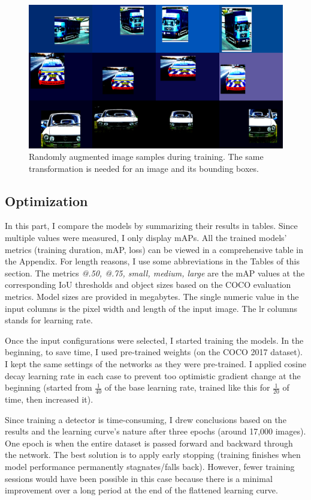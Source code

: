 \begin{figure}[htb]
 \centerline{\includegraphics[width=0.8\columnwidth]{.//Figure/PlateLocalization/img_augmentation.png}}
 \caption{Randomly augmented image samples during training. The same transformation is needed for an image and its bounding boxes.}
 \label{fig:img_augmentation}
\end{figure}

\subsection{Optimization}

In this part, I compare the models by summarizing their results in tables. Since multiple values were measured, I only display mAPs. All the trained models' metrics (training duration, mAP, loss) can be viewed in a comprehensive table in the Appendix. For length reasons, I use some abbreviations in the Tables of this section. The metrics \textit{@.50, @.75, small, medium, large} are the mAP values at the corresponding IoU thresholds and object sizes based on the COCO evaluation metrics\cite{MS-COCO}. Model sizes are provided in megabytes. The single numeric value in the input columns is the pixel width and length of the input image. The lr columns stands for learning rate.

Once the input configurations were selected, I started training the models. In the beginning, to save time, I used pre-trained weights (on the COCO 2017 dataset). I kept the same settings of the networks as they were pre-trained. I applied cosine decay learning rate in each case to prevent too optimistic gradient change at the beginning (started from \(\frac{1}{40}\) of the base learning rate, trained like this for \(\frac{1}{20}\) of time, then increased it).

Since training a detector is time-consuming, I drew conclusions based on the results and the learning curve's nature after three epochs (around 17,000 images). One epoch is when the entire dataset is passed forward and backward through the network. The best solution is to apply early stopping (training finishes when model performance permanently stagnates/falls back). However, fewer training sessions would have been possible in this case because there is a minimal improvement over a long period at the end of the flattened learning curve.

